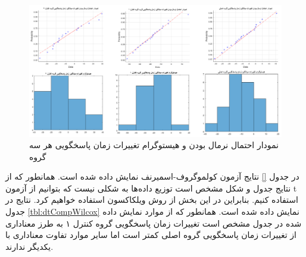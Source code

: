 \documentclass[twoside, a4paper,11pt]{book}
\numberwithin{equation}{chapter}
\numberwithin{table}{chapter}
\numberwithin{figure}{chapter}
\numberwithin{equation}{chapter}
\begin{document}
\begin{figure}
\centering
\includegraphics[scale=0.5]{Figures/dtNorm.png}
\caption{\label{fig:dtNorm}
نمودار احتمال نرمال بودن و هیستوگرام تغییرات زمان پاسخگویی هر سه گروه
}
\end{figure}

\begin{table}[]
\end{table}

در جدول \ref{} نتایج آزمون کولموگروف-اسمیرنف نمایش داده شده است. همانطور که از نتایج جدول و شکل مشخص است توزیع داده‌ها به شکلی نیست که بتوانیم از آزمون t استفاده کنیم. بنابراین در این بخش از روش ویلکاکسون استفاده خواهیم کرد. نتایج در جدول \ref{tbl:dtCompWilcox} نمایش داده شده است. همانطور که از موارد نمایش داده شده در جدول مشخص است تغییرات زمان پاسخگویی گروه کنترل ۱ به طرز معناداری از تغییرات زمان پاسخگویی گروه اصلی کمتر است اما سایر موارد تفاوت معناداری با یکدیگر ندارند.
\end{document}
